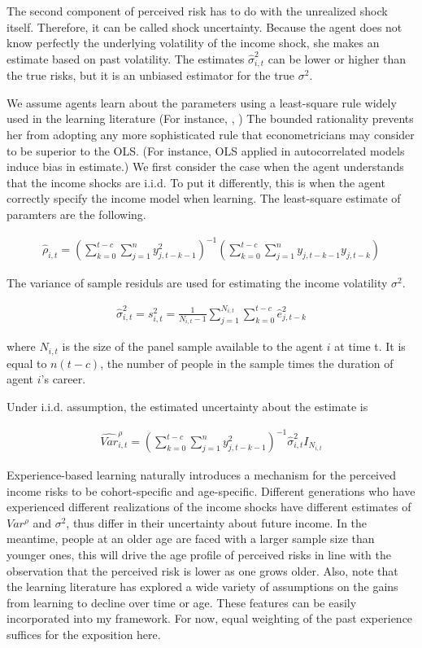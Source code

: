 \documentclass[12pt,notitlepage,onecolumn,aps,pra]{article}
\begin{document}
The second component of perceived risk has to do with the unrealized
shock itself. Therefore, it can be called shock uncertainty. Because the
agent does not know perfectly the underlying volatility of the income
shock, she makes an estimate based on past volatility. The estimates
\(\hat{\sigma}^2_{i,t}\) can be lower or higher than the true risks, but
it is an unbiased estimator for the true \(\sigma^2\).

We assume agents learn about the parameters using a least-square rule
widely used in the learning literature (For instance,
\cite{evans2012learning}, \cite{malmendier2015learning}) The bounded
rationality prevents her from adopting any more sophisticated rule that
econometricians may consider to be superior to the OLS. (For instance,
OLS applied in autocorrelated models induce bias in estimate.) We first
consider the case when the agent understands that the income shocks are
i.i.d. To put it differently, this is when the agent correctly specify
the income model when learning. The least-square estimate of paramters
are the following.

\begin{eqnarray}
\hat \rho_{i,t} = (\sum^{t-c}_{k=0}\sum^{n}_{j=1}y^2_{j,t-k-1})^{-1}(\sum^{t-c}_{k=0}\sum^{n}_{j=1}y_{j,t-k-1}y_{j,t-k})
\end{eqnarray}

The variance of sample residuls are used for estimating the income
volatility \(\sigma^2\).

\begin{eqnarray}
\widehat{\sigma}^2_{i,t} = s^2_{i,t} = \frac{1}{N_{i,t}-1} \sum^{N_{i,t}}_{j=1}\sum^{t-c}_{k=0} \hat e_{j,t-k}^2
\end{eqnarray}

where \(N_{i,t}\) is the size of the panel sample available to the agent
\(i\) at time t. It is equal to \(n(t-c)\), the number of people in the
sample times the duration of agent \(i\)'s career.

Under i.i.d. assumption, the estimated uncertainty about the estimate is

\begin{eqnarray}
\widehat {Var}^{\rho}_{i,t} = (\sum^{t-c}_{k=0}\sum^{n}_{j=1}y^2_{j,t-k-1})^{-1}\widehat{\sigma}^2_{i,t}I_{N_{i,t}}
\end{eqnarray}

Experience-based learning naturally introduces a mechanism for the
perceived income risks to be cohort-specific and age-specific. Different
generations who have experienced different realizations of the income
shocks have different estimates of \(Var^{\rho}\) and \(\sigma^2\), thus
differ in their uncertainty about future income. In the meantime, people
at an older age are faced with a larger sample size than younger ones,
this will drive the age profile of perceived risks in line with the
observation that the perceived risk is lower as one grows older. Also,
note that the learning literature has explored a wide variety of
assumptions on the gains from learning to decline over time or age.
These features can be easily incorporated into my framework. For now,
equal weighting of the past experience suffices for the exposition here.
\end{document}
